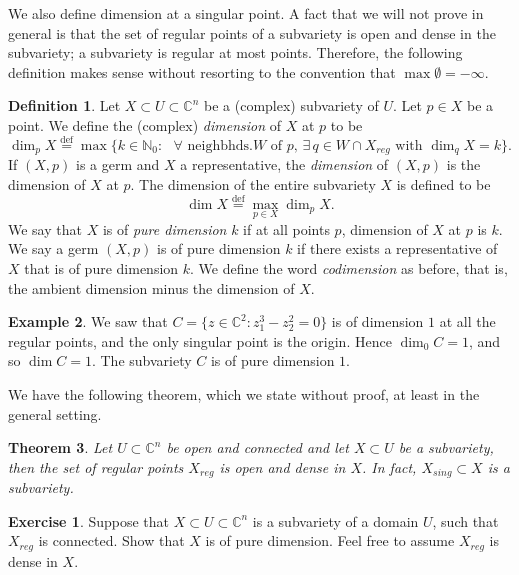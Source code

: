 \documentclass[12pt,openany]{book}
\newcommand{\C}{{\mathbb{C}}}
\newcommand{\N}{{\mathbb{N}}}
\newcommand{\myindex}[1]{#1\index{#1}}
\theoremstyle{plain}
\newtheorem{thm}{Theorem}[section]
\theoremstyle{remark}
\theoremstyle{definition}
\newtheorem{defn}[thm]{Definition}
\newenvironment{exbox}{%
    \def\FrameCommand{\vrule width 1pt \relax\hspace{10pt}}%
    \MakeFramed{\advance\hsize-\width\FrameRestore}%
}{%
    \endMakeFramed
}
\theoremstyle{exercise}
\newtheorem{exercise}{Exercise}[section]
\theoremstyle{example}
\newtheorem{example}[thm]{Example}
\begin{document}
We also define dimension at a singular point.
A fact that we will not prove in general is that
the set of regular points of a
subvariety is open and dense in the subvariety; a
subvariety is regular at most points.  Therefore, the
following definition makes sense without resorting to
the convention that $\max \emptyset = -\infty$.

\begin{defn}
Let $X \subset U \subset \C^n$ be a (complex) subvariety of $U$.  Let $p \in
X$ be a point.  We define the (complex)
\emph{\myindex{dimension}} of $X$ at $p$ to be
%
\begin{equation*}
\dim_p X \overset{\text{def}}{=}
\max \bigl\{ k \in \N_0 : \text{ $\forall$ neighbhds.
$W$ of $p$, $\exists \, q \in W \cap X_{\mathit{reg}}$ with $\dim_q X = k$}
\bigr\} .
\end{equation*}
If $(X,p)$ is a germ and $X$ a representative,
the \emph{dimension} of $(X,p)$ is the dimension of
$X$ at $p$.
The dimension of the entire subvariety $X$ is defined to be
%
\begin{equation*}
\dim X \overset{\text{def}}{=}
\max_{p \in X} \dim_p X .
\end{equation*}
We say that $X$ is of \emph{\myindex{pure dimension}} $k$ if at
all points $p$, dimension of $X$ at $p$ is $k$.
We say a germ $(X,p)$ is of pure dimension $k$ if there exists a representative
of $X$ that is of pure dimension $k$.
We define the word \emph{codimension} as before, that is, the
ambient dimension minus the dimension of $X$.
\end{defn}

\begin{example}
We saw that $C = \bigl\{ z \in \C^2 : z_1^3-z_2^2 = 0 \bigr\}$ is of
dimension $1$ at all the regular points, and the only singular point is the
origin.  Hence $\dim_0 C = 1$, and so $\dim C = 1$.  The subvariety $C$ is
of pure dimension $1$.
\end{example}


We have the following theorem, which we
state without proof, at least in the general setting.

\begin{thm}
Let $U \subset \C^n$ be open and connected and let $X \subset U$
be a subvariety, then the set of regular points $X_{\mathit{reg}}$
is open and dense in $X$.
In fact, $X_{\mathit{sing}} \subset X$ is a subvariety.
\end{thm}

\begin{exbox}
\begin{exercise}
Suppose that $X \subset U \subset \C^n$ is a subvariety
of a domain $U$, such that $X_{\mathit{reg}}$ is connected.  Show that $X$ is of
pure dimension.  Feel free to assume $X_{\mathit{reg}}$ is dense in $X$.
\end{exercise}
\end{exbox}
\end{document}
